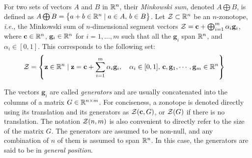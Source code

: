 For two sets of vectors $A$ and $B$ in $\mathbb{R}^n$, their \emph{Minkowski sum}, denoted $A\bigoplus B$, is defined as $A\bigoplus B = \left\{ a+b\in \mathbb{R}^n \mid a\in A,\, b\in B\right\}$. 
Let $\mathcal{Z} \subset \mathbb{R}^n$ be an $n$-zonotope, \emph{i.e.}, 
the Minkowski sum of $n$-dimensional segment vectors $\mathcal{Z} = \mathbf{c} + \bigoplus_{i=1}^m \alpha_i \mathbf{g}_i$, where $\mathbf{c} \in \mathbb{R}^n$, $\mathbf{g}_i \in \mathbb{R}^n$ for $i=1,\dots,m$ such that all the $\mathbf{g}_i$ span $\mathbb{R}^n$, and $\alpha_i\in[0,1]$. This corresponds to the following set:
\begin{align*}
  \mathcal{Z} &= \left\{ \mathbf{z} \in \mathbb{R}^n \mid \mathbf{z} = \mathbf{c} + \sum_{i=1}^m \alpha_i \mathbf{g}_i,\quad \alpha_i \in [0,1],\, \mathbf{c}, \mathbf{g}_1,\cdots,\mathbf{g}_m\in\mathbb{R}^n \right\}
\end{align*}

The vectors $\mathbf{g}_i$ are called \emph{generators} and are usually concatenated into the columns of a matrix $G\in\mathbb{R}^{n\times m}$. For conciseness, a zonotope is denoted directly using its translation and its generators as $\mathcal{Z}(\mathbf{c}, G)$, or $\mathcal{Z}(G)$ if there is no translation. The notation $\mathcal{Z}(n, m)$ is also convenient to directly refer to the size of the matrix $G$. The generators are assumed to be non-null, and any combination of $n$ of them is assumed to span $\mathbb{R}^n$. In this case, the generators are said to be in \emph{general position}.

